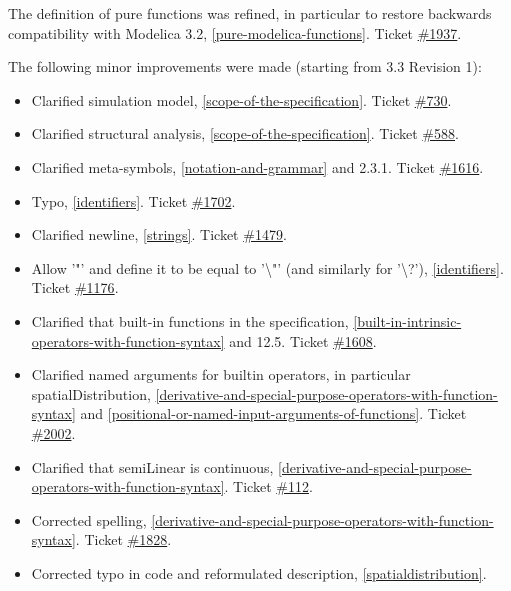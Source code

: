 The definition of pure functions was refined, in particular to restore
backwards compatibility with Modelica 3.2, \ref{pure-modelica-functions}. Ticket
\href{https://trac.modelica.org/Modelica/ticket/1937}{\#1937}.

The following minor improvements were made (starting from 3.3 Revision
1):

\begin{itemize}
\item
  Clarified simulation model, \ref{scope-of-the-specification}. Ticket
  \href{https://trac.modelica.org/Modelica/ticket/730}{\#730}.
\item
  Clarified structural analysis, \ref{scope-of-the-specification}. Ticket
  \href{https://trac.modelica.org/Modelica/ticket/588}{\#588}.
\item
  Clarified meta-symbols, \ref{notation-and-grammar} and 2.3.1. Ticket
  \href{https://trac.modelica.org/Modelica/ticket/1616}{\#1616}.
\item
  Typo, \ref{identifiers}. Ticket
  \href{https://trac.modelica.org/Modelica/ticket/1702}{\#1702}.
\item
  Clarified newline, \ref{strings}. Ticket
  \href{https://trac.modelica.org/Modelica/ticket/1479}{\#1479}.
\item
  Allow '"' and define it to be equal to '\textbackslash{}"' (and
  similarly for '\textbackslash{}?'), \ref{identifiers}. Ticket
  \href{https://trac.modelica.org/Modelica/ticket/1176}{\#1176}.
\item
  Clarified that built-in functions in the specification, \ref{built-in-intrinsic-operators-with-function-syntax}
  and 12.5. Ticket
  \href{https://trac.modelica.org/Modelica/ticket/1608}{\#1608}.
\item
  Clarified named arguments for builtin operators, in particular
  spatialDistribution, \ref{derivative-and-special-purpose-operators-with-function-syntax} and \ref{positional-or-named-input-arguments-of-functions}. Ticket
  \href{https://trac.modelica.org/Modelica/ticket/2002}{\#2002}.
\item
  Clarified that semiLinear is continuous, \ref{derivative-and-special-purpose-operators-with-function-syntax}. Ticket
  \href{https://trac.modelica.org/Modelica/ticket/112}{\#112}.
\item
  Corrected spelling, \ref{derivative-and-special-purpose-operators-with-function-syntax}. Ticket
  \href{https://trac.modelica.org/Modelica/ticket/1828}{\#1828}.
\item
  Corrected typo in code and reformulated description, \ref{spatialdistribution}.

\end{itemize}
